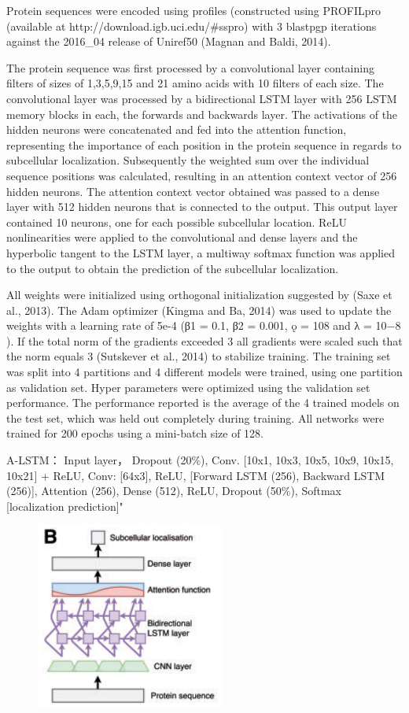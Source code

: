 \documentclass[]{scrartcl}
\begin{document}
Protein sequences were encoded using profiles (constructed using PROFILpro (available at http://download.igb.uci.edu/\#sspro) with 3 blastpgp iterations against the 2016\_04 release of Uniref50 (Magnan and Baldi, 2014).

The protein sequence was first processed by a convolutional layer containing filters of sizes of 1,3,5,9,15 and 21 amino acids with 10 filters of each size. The convolutional layer was processed by a bidirectional LSTM layer with 256 LSTM memory blocks in each, the forwards and backwards layer. The activations of the hidden neurons were concatenated and fed into the attention function, representing the importance of each position in the protein sequence in regards to subcellular localization. Subsequently the weighted sum over the individual sequence positions was calculated, resulting in an attention context vector of 256 hidden neurons. The attention context vector obtained was passed to a dense layer with 512 hidden neurons that is connected to the output. This output layer contained 10 neurons, one for each possible subcellular location. ReLU nonlinearities were applied to the convolutional and dense layers and the hyperbolic tangent to the LSTM layer, a multiway softmax function was applied to the output to obtain the prediction of the subcellular localization.

All weights were initialized using orthogonal initialization suggested by (Saxe et al., 2013). The Adam optimizer (Kingma and Ba, 2014) was used to update the weights with a learning rate of 5e-4 (β1 = 0.1, β2 = 0.001, ǫ = 108 and λ = 10−8 ). If the total norm of the gradients exceeded 3 all gradients were scaled such that the norm equals 3 (Sutskever et al., 2014) to stabilize training. The training set was split into 4 partitions and 4 different models were trained, using one partition as validation set. Hyper parameters were optimized using the validation set performance. The performance reported is the average of the 4 trained models on the test set, which was held out completely during training. All networks were trained for 200 epochs using a mini-batch size of 128.

A-LSTM：
Input layer，
Dropout (20\%),
Conv. [10x1, 10x3, 10x5, 10x9, 10x15, 10x21] + ReLU,
Conv: [64x3],
ReLU,
[Forward LSTM (256), Backward LSTM (256)],
Attention (256),
Dense (512),
ReLU,
Dropout (50\%),
Softmax [localization prediction]" \cite{Jurtz2017}
\begin{figure}[h]
\centering
\includegraphics[width=0.4\linewidth]{subcellular}
\label{fig:subcellular}
\end{figure}
\end{document}
